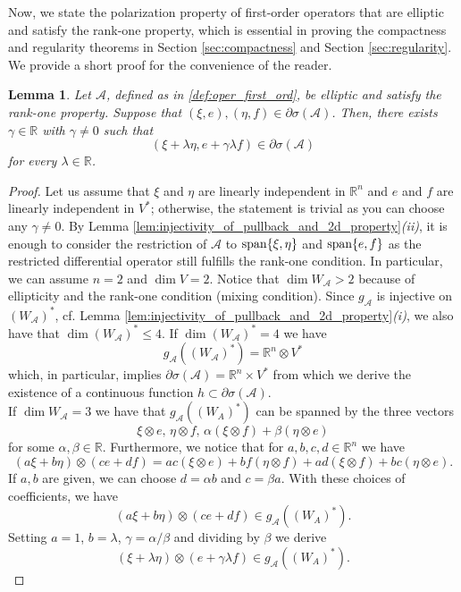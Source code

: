 \documentclass[11pt,reqno]{amsart}
\theoremstyle{plain}
\newtheorem{lemma}[theorem]{Lemma}
\theoremstyle{definition}
\theoremstyle{remark}
\numberwithin{equation}{section}
\newcommand{\R}{\mathbb{R}}
\newcommand{\A}{\mathcal{A}}
\newcommand{\1}{\mathbbm{1}} %
\newcommand{\Span}{\textnormal{span}}
\begin{document}
Now, we state the polarization \cite[Proposition 4.4]{AR20} property of first-order operators that are elliptic and satisfy the rank-one property, which is essential in proving the compactness and regularity theorems in Section \ref{sec:compactness} and Section \ref{sec:regularity}. We provide a short proof for the convenience of the reader.

\begin{lemma}\label{lem:polarization}
    Let $\A$, defined as in \eqref{def:oper_first_ord}, be elliptic and satisfy the rank-one property. Suppose that $(\xi, e), (\eta, f) \in \partial \sigma(\A)$. Then, there exists $\gamma \in \R$ with $\gamma \neq 0$ such that 
    \[
        (\xi + \lambda \eta, e + \gamma \lambda f) \in \partial \sigma (\A)
    \]
    for every $\lambda \in \R$.
\end{lemma}

\begin{proof}
    Let us assume that $\xi$ and $\eta$ are linearly independent in $\R^n$ and $e$ and $f$ are linearly independent in $V^*$; otherwise, the statement is trivial as you can choose any $\gamma \neq 0$. By Lemma \ref{lem:injectivity_of_pullback_and_2d_property}{\it (ii)}, it is enough to consider the restriction of $\A$ to $\Span\{ \xi, \eta\}$ and $\Span\{ e,f \}$ as the restricted differential operator still fulfills the rank-one condition. In particular, we can assume $n = 2$ and $\dim V = 2$. Notice that $\dim W_\A > 2$ because of ellipticity and the rank-one condition (mixing condition). Since $g_\A$ is injective on $(W_\A)^*$, cf. Lemma \ref{lem:injectivity_of_pullback_and_2d_property}{\it (i)}, we also have that $\dim (W_\A)^* \leq 4$. If $\dim (W_\A)^* = 4$ we have 
    \[
        g_\A((W_\A)^*) = \R^n \otimes V^*
    \]
    which, in particular, implies $\partial \sigma(\A) = \R^n \times V^*$ from which we derive the existence of a continuous function $h \subset \partial \sigma(\A)$. \\
    If $\dim W_\A = 3$ we have that $g_\A((W_A)^*)$ can be spanned by the three vectors
    \[
        \xi \otimes e, \, \eta \otimes f,\, \alpha (\xi \otimes f) + \beta (\eta \otimes e)
    \]
    for some $\alpha, \beta \in \R$. Furthermore, we notice that for $a, b, c, d \in \R^n$ we have
    \[
        (a \xi + b \eta) \otimes (c e + d f) = ac (\xi \otimes e) + bf (\eta \otimes f) + ad (\xi \otimes f) + bc (\eta \otimes e).
    \]
    If $a, b$ are given, we can choose $d = \alpha b$ and $c = \beta a$. With these choices of coefficients, we have
    \[
        (a \xi + b \eta) \otimes (c e + d f) \in g_\A((W_A)^*).
    \]
    Setting $a = 1$, $b = \lambda$, $\gamma = \alpha/\beta$ and dividing by $\beta$ we derive 
    \[
        (\xi + \lambda \eta) \otimes (e + \gamma \lambda f) \in g_\A((W_A)^*).
    \]
\end{proof}
\end{document}
